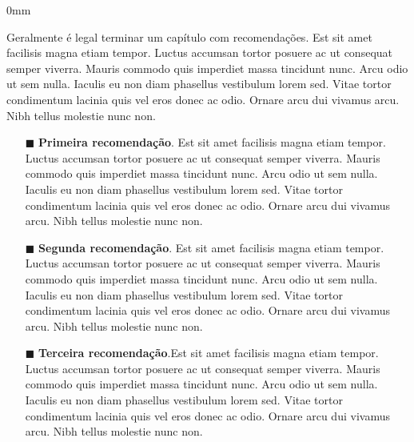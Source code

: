 \documentclass[./main.tex]{subfiles}
\begin{document}
\begin{adjustwidth}{\bodytab}{0mm}
\par Geralmente é legal terminar um capítulo com recomendações. Est sit amet facilisis magna etiam tempor. Luctus accumsan tortor posuere ac ut consequat semper viverra. Mauris commodo quis imperdiet massa tincidunt nunc. Arcu odio ut sem nulla. Iaculis eu non diam phasellus vestibulum lorem sed. Vitae tortor condimentum lacinia quis vel eros donec ac odio. Ornare arcu dui vivamus arcu. Nibh tellus molestie nunc non.

\begin{itemize}
    \item[$\blacksquare$] \textbf{Primeira recomendação}. Est sit amet facilisis magna etiam tempor. Luctus accumsan tortor posuere ac ut consequat semper viverra. Mauris commodo quis imperdiet massa tincidunt nunc. Arcu odio ut sem nulla. Iaculis eu non diam phasellus vestibulum lorem sed. Vitae tortor condimentum lacinia quis vel eros donec ac odio. Ornare arcu dui vivamus arcu. Nibh tellus molestie nunc non.
    \item  [$\blacksquare$] \textbf{Segunda recomendação}. Est sit amet facilisis magna etiam tempor. Luctus accumsan tortor posuere ac ut consequat semper viverra. Mauris commodo quis imperdiet massa tincidunt nunc. Arcu odio ut sem nulla. Iaculis eu non diam phasellus vestibulum lorem sed. Vitae tortor condimentum lacinia quis vel eros donec ac odio. Ornare arcu dui vivamus arcu. Nibh tellus molestie nunc non.
    \item[$\blacksquare$] \textbf{Terceira recomendação}.Est sit amet facilisis magna etiam tempor. Luctus accumsan tortor posuere ac ut consequat semper viverra. Mauris commodo quis imperdiet massa tincidunt nunc. Arcu odio ut sem nulla. Iaculis eu non diam phasellus vestibulum lorem sed. Vitae tortor condimentum lacinia quis vel eros donec ac odio. Ornare arcu dui vivamus arcu. Nibh tellus molestie nunc non. 
\end{itemize}

\end{adjustwidth}
\end{document}
